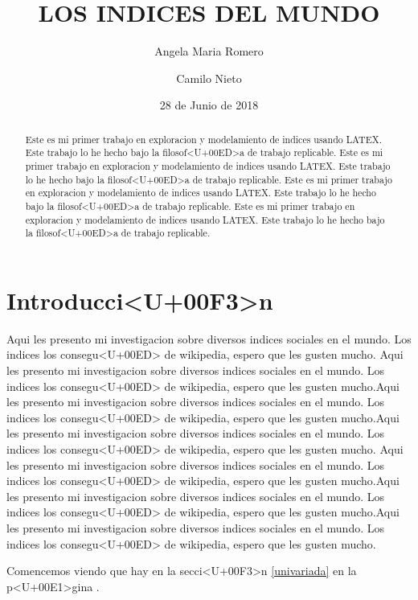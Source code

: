 \documentclass{article}
\title{LOS INDICES DEL MUNDO}
\author[1]{\normalsize Angela Maria Romero}
\author[2]{\normalsize Camilo Nieto}
\affil[1,2]{\small  Escuela de Ingenieria,Universidad de los Andes\\
\texttt{{am.romero14,ca.nieto11}@uniandes.edu.col}}
\affil[1]{\small Universidad de los Andes\\

\texttt{am.romero14@bp.com.col}}
\date{28 de Junio de 2018}
\begin{document}


\maketitle


\begin{abstract}
Este es mi primer trabajo en exploracion y modelamiento de indices usando LATEX. Este trabajo lo he hecho bajo la filosof<U+00ED>a de trabajo replicable. Este es mi primer trabajo en exploracion y modelamiento de indices usando LATEX. Este trabajo lo he hecho bajo la filosof<U+00ED>a de trabajo replicable. Este es mi primer trabajo en exploracion y modelamiento de indices usando LATEX. Este trabajo lo he hecho bajo la filosof<U+00ED>a de trabajo replicable. Este es mi primer trabajo en exploracion y modelamiento de indices usando LATEX. Este trabajo lo he hecho bajo la filosof<U+00ED>a de trabajo replicable.
\end{abstract}

\section*{Introducci<U+00F3>n}

Aqui les presento mi investigacion sobre diversos indices sociales en el mundo. Los indices los consegu<U+00ED> de wikipedia, espero que les gusten mucho. Aqui les presento mi investigacion sobre diversos indices sociales en el mundo. Los indices los consegu<U+00ED> de wikipedia, espero que les gusten mucho.Aqui les presento mi investigacion sobre diversos indices sociales en el mundo. Los indices los consegu<U+00ED> de wikipedia, espero que les gusten mucho.Aqui les presento mi investigacion sobre diversos indices sociales en el mundo. Los indices los consegu<U+00ED> de wikipedia, espero que les gusten mucho.
Aqui les presento mi investigacion sobre diversos indices sociales en el mundo. Los indices los consegu<U+00ED> de wikipedia, espero que les gusten mucho.Aqui les presento mi investigacion sobre diversos indices sociales en el mundo. Los indices los consegu<U+00ED> de wikipedia, espero que les gusten mucho.Aqui les presento mi investigacion sobre diversos indices sociales en el mundo. Los indices los consegu<U+00ED> de wikipedia, espero que les gusten mucho.

Comencemos viendo que hay en la secci<U+00F3>n \ref{univariada} en la p<U+00E1>gina \pageref{univariada}.

\clearpage
\end{document}

